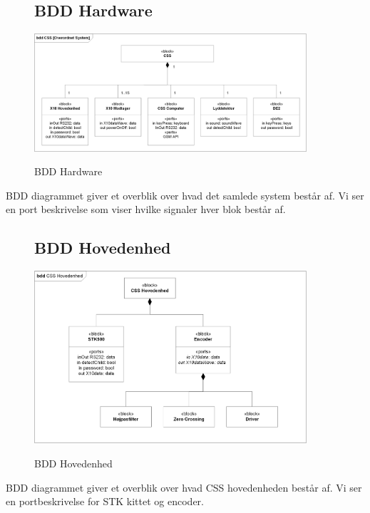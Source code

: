 \begin{figure}[!htbp] \centering
\subsection{BDD Hardware}
{\includegraphics[width=0.9\textwidth]{billeder/diagrammer/BDD_Hardware}}
\caption{BDD Hardware}
\label{lab:bddhardware}
\raggedright
\end{figure}
BDD diagrammet giver et overblik over hvad det samlede system består af. Vi ser en port beskrivelse som viser hvilke signaler hver blok består af.

\begin{figure}[!htbp] \centering
\subsection{BDD Hovedenhed}
{\includegraphics[width=0.9\textwidth]{billeder/diagrammer/BDD_Hovedenhed}}
\caption{BDD Hovedenhed}
\label{lab:bddhovedenhed}
\raggedright
\end{figure}
BDD diagrammet giver et overblik over hvad CSS hovedenheden består af. Vi ser en portbeskrivelse for STK kittet og encoder. 

